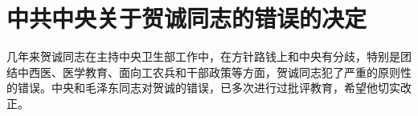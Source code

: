 \section[中共中央关于贺诚同志的错误的决定（一九五五年九月三十日）]{中共中央关于贺诚同志的错误的决定}


几年来贺诚同志在主持中央卫生部工作中，在方针路钱上和中央有分歧，特别是团结中西医、医学教育、面向工农兵和干部政策等方面，贺诚同志犯了严重的原则性的错误。中央和毛泽东同志对贺诚的错误，已多次进行过批评教育，希望他切实改正。


